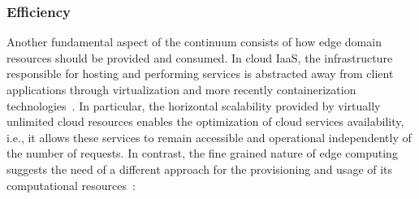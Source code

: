 

\subsubsection{Efficiency}

Another fundamental aspect of the continuum consists of how edge domain resources should be provided and consumed. In cloud IaaS, the infrastructure responsible for hosting and performing services is abstracted away from client applications through virtualization and more recently containerization technologies~\cite{Quatrocchi2016discrete}. In particular, the horizontal scalability provided by virtually unlimited cloud resources enables the optimization of cloud services availability, i.e., it allows these services to remain accessible and operational independently of the number of requests. In contrast, the fine grained nature of edge computing suggests the need of a different approach for the provisioning and usage of its computational resources~\cite{GarrigaMendonca2017}: 






